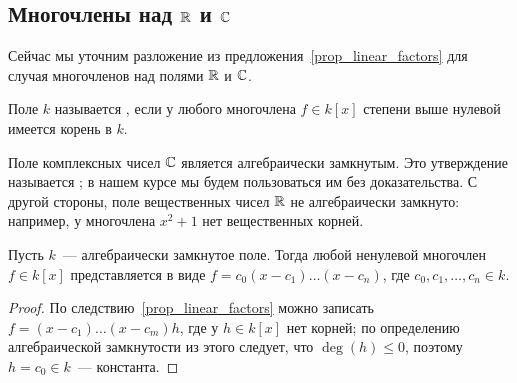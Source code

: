 \subsection{Многочлены над $\mathbb R$ и $\mathbb C$}


Сейчас мы уточним разложение из предложения~\ref{prop_linear_factors}
для случая многочленов над полями $\mathbb R$ и $\mathbb C$.

\begin{definition}
Поле $k$ называется , если у любого
многочлена $f\in k[x]$ степени выше нулевой имеется корень в $k$.
\end{definition}

\begin{example}
Поле комплексных чисел $\mathbb C$ является алгебраически замкнутым. Это
утверждение называется ; в нашем курсе
мы будем пользоваться им без доказательства. С другой стороны, поле
вещественных чисел $\mathbb R$ не алгебраически замкнуто: например, у
многочлена $x^2+1$ нет вещественных корней.
\end{example}

\begin{theorem}\label{thm_irreducible_complex}
Пусть $k$~--- алгебраически замкнутое поле. Тогда любой ненулевой
многочлен $f\in k[x]$ представляется в виде
$f=c_0(x-c_1)\dots(x-c_n)$, где $c_0,c_1,\dots,c_n\in k$.
\end{theorem}
\begin{proof}
По следствию~\ref{prop_linear_factors} можно записать $f=(x-c_1)\dots
(x-c_m)h$, где у $h\in k[x]$ нет корней; по определению алгебраической
замкнутости из этого следует, что $\deg(h)\leq 0$, поэтому $h=c_0\in
k$~--- константа.
\end{proof}

